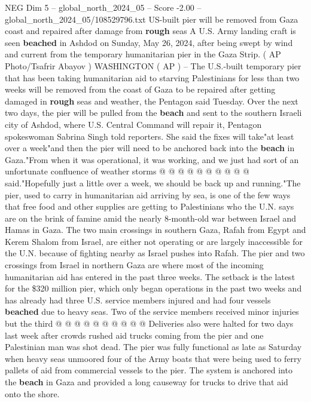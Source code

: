 \begin{textsample}{NEG Dim 5 – global\_north\_2024\_05 – Score -2.00 – global\_north\_2024\_05/108529796.txt}  \label{ex:f5_neg_284}
US-built pier will be removed from Gaza coast and repaired after damage from \textbf{rough} seas A U.S.
Army landing craft is seen \textbf{beached} in Ashdod on Sunday, May 26, 2024, after being swept by wind and current from the temporary humanitarian pier in the Gaza Strip. ( AP Photo/Tsafrir Abayov ) WASHINGTON ( AP ) -- The U.S.-built temporary pier that has been taking humanitarian aid to starving Palestinians for less than two weeks will be removed from the coast of Gaza to be repaired after getting damaged in \textbf{rough} seas and weather, the Pentagon said Tuesday.
Over the next two days, the pier will be pulled from the \textbf{beach} and sent to the southern Israeli city of Ashdod, where U.S.
Central Command will repair it, Pentagon spokeswoman Sabrina Singh told reporters.
She said the fixes will take"at least over a week"and then the pier will need to be anchored back into the \textbf{beach} in Gaza."From when it was operational, it was working, and we just had sort of an unfortunate confluence of weather storms @ @ @ @ @ @ @ @ @ @ said."Hopefully just a little over a week, we should be back up and running."The pier, used to carry in humanitarian aid arriving by sea, is one of the few ways that free food and other supplies are getting to Palestinians who the U.N. says are on the brink of famine amid the nearly 8-month-old war between Israel and Hamas in Gaza.
The two main crossings in southern Gaza, Rafah from Egypt and Kerem Shalom from Israel, are either not operating or are largely inaccessible for the U.N. because of fighting nearby as Israel pushes into Rafah.
The pier and two crossings from Israel in northern Gaza are where most of the incoming humanitarian aid has entered in the past three weeks.
The setback is the latest for the \$320 million pier, which only began operations in the past two weeks and has already had three U.S. service members injured and had four vessels \textbf{beached} due to heavy seas.
Two of the service members received minor injuries but the third @ @ @ @ @ @ @ @ @ @ Deliveries also were halted for two days last week after crowds rushed aid trucks coming from the pier and one Palestinian man was shot dead.
The pier was fully functional as late as Saturday when heavy seas unmoored four of the Army boats that were being used to ferry pallets of aid from commercial vessels to the pier.
The system is anchored into the \textbf{beach} in Gaza and provided a long causeway for trucks to drive that aid onto the shore.

\end{textsample}
